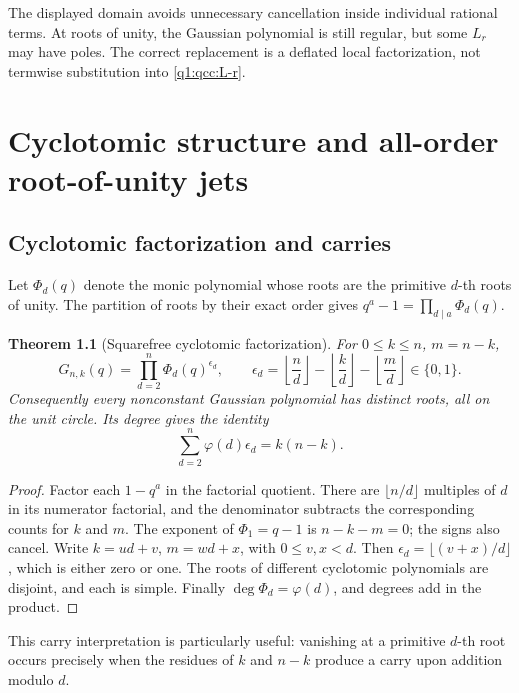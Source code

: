 \documentclass[11pt,a4paper,oneside,openany]{book}
\newtheorem{theorem}{Theorem}[chapter]
\theoremstyle{definition}
\theoremstyle{remark}
\begin{document}
The displayed domain avoids unnecessary cancellation inside individual rational
terms. At roots of unity, the Gaussian polynomial is still regular, but some
\(L_r\) may have poles. The correct replacement is a deflated local
factorization, not termwise substitution into \eqref{q1:qcc:L-r}.
\chapter{Cyclotomic structure and all-order root-of-unity jets}
\label{q1:qcc:roots}
\section{Cyclotomic factorization and carries}
Let \(\Phi_d(q)\) denote the monic polynomial whose roots are the primitive
\(d\)-th roots of unity. The partition of roots by their exact order gives
\(q^a-1=\prod_{d\mid a}\Phi_d(q)\).

\begin{theorem}[Squarefree cyclotomic factorization]\label{q1:qcc:cyclotomic}
For \(0\le k\le n\), \(m=n-k\),
\begin{equation}\label{q1:qcc:cyclotomic-product}
 G_{n,k}(q)=\prod_{d=2}^{n}\Phi_d(q)^{\epsilon_d},\qquad
 \epsilon_d=\left\lfloor\frac nd\right\rfloor
      -\left\lfloor\frac kd\right\rfloor
      -\left\lfloor\frac md\right\rfloor\in\{0,1\}.
\end{equation}
Consequently every nonconstant Gaussian polynomial has distinct roots, all on
the unit circle. Its degree gives the identity
\begin{equation}\label{q1:qcc:totient-degree}
 \sum_{d=2}^{n}\varphi(d)\epsilon_d=k(n-k).
\end{equation}
\end{theorem}
\begin{proof}
Factor each \(1-q^a\) in the factorial quotient. There are
\(\lfloor n/d\rfloor\) multiples of \(d\) in its numerator factorial,
and the denominator subtracts the corresponding counts for \(k\) and \(m\).
The exponent of \(\Phi_1=q-1\) is \(n-k-m=0\); the signs also cancel.
Write \(k=ud+v\), \(m=wd+x\), with \(0\le v,x<d\). Then
\(\epsilon_d=\lfloor(v+x)/d\rfloor\), which is either zero or one.
The roots of different cyclotomic polynomials are disjoint, and each is simple.
Finally \(\deg\Phi_d=\varphi(d)\), and degrees add in the product.
\end{proof}
This carry interpretation is particularly useful: vanishing at a primitive
\(d\)-th root occurs precisely when the residues of \(k\) and \(n-k\)
produce a carry upon addition modulo \(d\).
\end{document}
